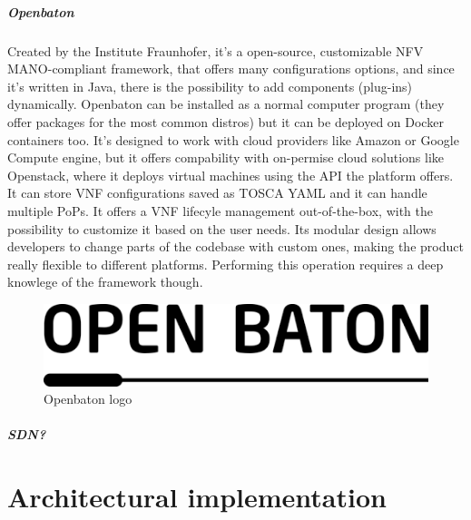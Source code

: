 \documentclass[10pt]{book}
\begin{document}
\paragraph{Openbaton} Created by the Institute Fraunhofer, it's a open-source, 
customizable NFV MANO-compliant framework, that offers many configurations 
options, and since it's written in Java, there is the possibility to add 
components (plug-ins) dynamically. Openbaton can be installed as a normal 
computer program (they offer packages for the most common distros) but it can 
be deployed on Docker containers too. It's designed to work with cloud 
providers like Amazon or Google Compute engine, but it offers compability with 
on-permise cloud solutions like Openstack, where it deploys virtual machines 
using the API the platform offers. It can store VNF configurations saved as 
TOSCA YAML and it can handle multiple 
PoPs. It offers a VNF lifecyle management 
out-of-the-box, with the possibility to customize it based on the user needs. 
Its modular design allows developers to change parts of the codebase with 
custom ones, making the product really flexible to different platforms. 
Performing this operation requires a deep knowlege of the framework though.
\begin{figure}[h]
 \centering
 \includegraphics[scale=0.45]{openbaton_logo}
 \caption{Openbaton logo}
 \label{chap:prjan:img:openbaton_logo}
\end{figure}

\paragraph{SDN?}

\chapter{Architectural implementation}
\label{chap:archimpl}
\end{document}
